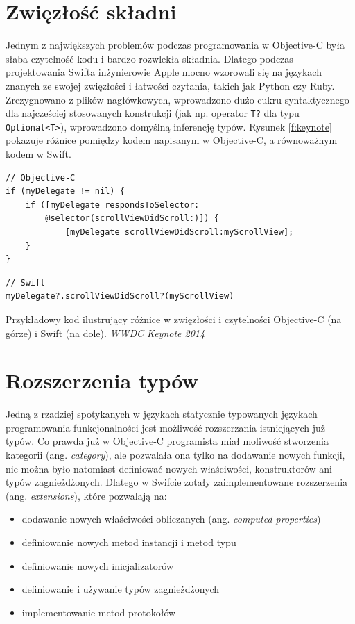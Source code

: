 \documentclass[mgr, shortabstract]{iithesis}
\newcommand{\ang}[1]{ang. \textit{#1}}
\begin{document}
\section{Zwięzłość składni}
\label{s:zwiezlosc_skladni}

Jednym z największych problemów podczas programowania w Objective-C była słaba czytelność kodu i bardzo rozwlekła składnia. Dlatego podczas projektowania Swifta inżynierowie Apple mocno wzorowali się na językach znanych ze swojej zwięzłości i łatwości czytania, takich jak Python czy Ruby. Zrezygnowano z plików nagłówkowych, wprowadzono dużo cukru syntaktycznego dla najcześciej stosowanych konstrukcji (jak np. operator \texttt{T?} dla typu \texttt{Optional<T>}), wprowadzono domyślną inferencję typów. Rysunek \ref{f:keynote} pokazuje różnice pomiędzy kodem napisanym w Objective-C, a równoważnym kodem w Swift.

\begin{listing}[ht]
\begin{verbatim}
// Objective-C
if (myDelegate != nil) {
    if ([myDelegate respondsToSelector:
        @selector(scrollViewDidScroll:)]) {
            [myDelegate scrollViewDidScroll:myScrollView];
    }
}
\end{verbatim}

\begin{verbatim}
// Swift
myDelegate?.scrollViewDidScroll?(myScrollView)
\end{verbatim}
\caption{Przykładowy kod ilustrujący różnice w zwięzłości i czytelności Objective-C (na górze) i Swift (na dole). \textit{WWDC Keynote 2014}}
\label{f:keynote}
\end{listing}

\section{Rozszerzenia typów}
\label{s:rozszerzenia_typow}

Jedną z rzadziej spotykanych w językach statycznie typowanych językach programowania funkcjonalności jest możliwość rozszerzania istniejących już typów. Co prawda już w Objective-C programista miał moliwość stworzenia kategorii (\ang{category}), ale pozwalała ona tylko na dodawanie nowych funkcji, nie można było natomiast definiować nowych właściwości, konstruktorów ani typów zagnieżdżonych. Dlatego w Swifcie zotały zaimplementowane rozszerzenia (\ang{extensions}), które pozwalają na:

\begin{itemize}
    \item dodawanie nowych właściwości obliczanych (\ang{computed properties})
    \item definiowanie nowych metod instancji i metod typu
    \item definiowanie nowych inicjalizatorów
    \item definiowanie i używanie typów zagnieżdżonych
    \item implementowanie metod protokołów
\end{itemize}
\end{document}
